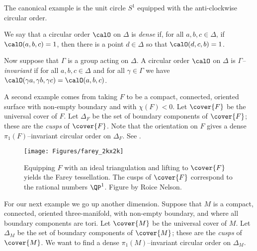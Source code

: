\documentclass[12pt]{amsart}
\begin{document}
\begin{example}
The canonical example is the unit circle $S^1$ equipped with the anti-clockwise circular order. 
\end{example}

\begin{definition}
\label{Def:Dense}
We say that a circular order $\calO$ on $\Delta$ is \emph{dense} if, for all $a, b, c \in \Delta$, if $\calO(a, b, c) = 1$, then there is a point $d \in \Delta$ so that $\calO(d, c, b) = 1$. 
\end{definition}

\begin{definition}
Now suppose that $\Gamma$ is a group acting on $\Delta$.  A circular order $\calO$ on $\Delta$ is \emph{$\Gamma$--invariant} if for all $a, b, c \in \Delta$ and for all $\gamma \in \Gamma$ we have $\calO(\gamma a, \gamma b, \gamma c) = \calO(a, b, c)$.
\end{definition}

\begin{example}
A second example comes from taking $F$ to be a compact, connected, oriented surface with non-empty boundary and with $\chi(F) < 0$.
Let $\cover{F}$ be the universal cover of $F$.  Let $\Delta_F$ be the set of boundary components of $\cover{F}$; these are the \emph{cusps} of $\cover{F}$.  Note that the orientation on $F$ gives a dense $\pi_1(F)$--invariant circular order on $\Delta_F$.  See . 
\end{example}

\begin{figure}[htbp]
\texttt{[image: Figures/farey\_2kx2k]}
\caption{Equipping $F$ with an ideal triangulation and lifting to $\cover{F}$ yields the Farey tessellation.  The cusps of $\cover{F}$ correspond to the rational numbers $\QP^1$.  Figure by Roice Nelson.}
\label{Fig:Farey}
\end{figure}

For our next example we go up another dimension.  Suppose that $M$ is a compact, connected, oriented three-manifold, with non-empty boundary, and where all boundary components are tori.  Let $\cover{M}$ be the universal cover of $M$.  Let $\Delta_M$ be the set of boundary components of $\cover{M}$; these are the \emph{cusps} of $\cover{M}$.  We want to find a dense $\pi_1(M)$--invariant circular order on $\Delta_M$.
\end{document}
